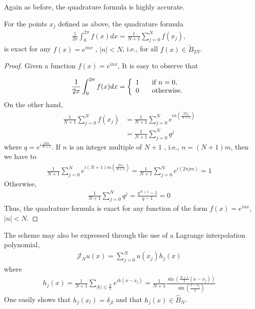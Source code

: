     \noindent Again as before, the quadrature formula is highly accurate. \\
    \begin{teor}
    \label{Exactness_Odd}	
    For the points $x_j$ defined as above, the quadrature formula
    \begin{align*}
         \frac{1}{2\pi}\displaystyle \int^{2\pi}_{0} f(x) dx = \frac{1}{N+1} \displaystyle \sum^{N}_{j=0} f(x_j),
    \end{align*}
    is exact for any $f(x) = e^{inx}$ , $|n| < N$, i.e., for all $f(x) \in \widetilde{B}_{2N}$.
    \begin{proof}
    	Given a function $f(x) = e^{in x}$, It is easy to observe that
    	
    	\begin{align*}
    		\frac{1}{2\pi}\displaystyle \int^{2\pi}_{0} f(x) dx =  \left \lbrace \begin{array}{ll}
    			1 \hspace{3mm} & \text{if } n = 0, \\
    			0 \hspace{3mm} & \text{otherwise.}
    		\end{array}  \right . 
    	\end{align*}
    	On the other hand,    
    	\begin{align*}
    		\frac{1}{N+1}  \displaystyle \sum_{j = 0}^{N} f(x_j) &= \frac{1}{N+1}  \displaystyle \sum_{j = 0}^{N} e^{in (\frac{2\pi j}{N+1})} \\
    		&= \frac{1}{N+1}  \displaystyle \sum_{j = 0}^{N} q^j
    	\end{align*}
    	where $q = e^{i \frac{2\pi n}{N+1}}$. If $n$ is an integer multiple of $N+1$ , i.e., $n = (N+1)m$, then we have to
    	\begin{align*}
    		\displaystyle \frac{1}{N+1} \sum^{N}_{j=0}  e^{i(N+1)m (\frac{2\pi j}{N+1})} = \frac{1}{N+1} \sum^{N}_{j=0}  e^{i (2\pi jm)} = 1
    	\end{align*}
    	 Otherwise, 
    	\begin{align*}
    		\displaystyle \frac{1}{N+1} \sum^{N}_{j=0} q^j = \frac{q^{N+1} - 1}{q - 1} = 0
    	\end{align*}
    	Thus, the quadrature formula is exact for any function of the form $f(x) = e^{inx}$, $|n| < N$.
    \end{proof}
    
    \end{teor}
    The scheme may also be expressed through the use of a Lagrange interpolation polynomial,
    \begin{align}
    \label{Lagrange_Odd}	
    	\mathcal{J}_N u(x) =  \displaystyle \sum_{j=0}^{N} u(x_j) h_j (x)
	\end{align}
	where
	\begin{align}
	    h_j (x) = \displaystyle \frac{1}{N+1} \sum_{|k| \leq \frac{N}{2}} e^{ik (x - x_j)} = \frac{1}{N + 1} \frac{\sin(\frac{N+1}{2}(x - x_j))}{\sin(\frac{x - x_j}{2})}
	\end{align}
    One easily shows that $h_j (x_l) = \delta_{jl}$ and that $h_j (x) \in \hat{B}_N $.
	
